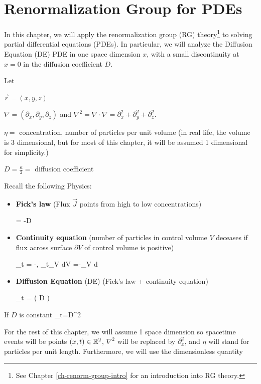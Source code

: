 \chapter{Renormalization Group for PDEs}
\label{ch-renorm-group-pde}

%
%

In this chapter, we will
apply the renormalization group (RG)
theory\footnote{See Chapter \ref{ch-renorm-group-intro}
for an introduction into RG theory.} to solving partial differential equations (PDEs).
In particular, we will analyze the Diffusion Equation (DE) PDE
in one space dimension $x$, with a small discontinuity at $x=0$ 
in the diffusion coefficient $D$.

Let

$\vec{r}=(x,y,z)$


$\nabla = (\partial_{x}, \partial_{y}, \partial_{z})$ and $\nabla^2 = \nabla\cdot\nabla=\partial^2_x + \partial^2_y + \partial^2_z$.

$\eta=$ concentration,
number of particles per unit volume (in real life, the volume 
is 3 dimensional, but for most of this chapter, it will be
assumed 1 dimensional for simplicity.)

$D=\frac{\kappa}{2}=$ diffusion coefficient

Recall the following Physics:
\begin{itemize}
\item {\bf Fick's law} (Flux $\vec{J}$ points from high to low concentrations)

\beq
{}= -D\nabla \eta
\eeq
\item {\bf Continuity equation} (number of particles in control volume $V$  deceases if flux across surface $\partial V$ of control volume is positive)

\beq
\partial_t \eta = -\nabla\cdot {}, \quad \partial_t\int_V dV\; \eta =-\int_{\partial V} d\cdot {}
\eeq

\item
{\bf Diffusion Equation }(DE) (Fick's law + continuity equation)

\beq
\partial_t \eta = \nabla 
\left(
D\nabla \eta
\right)
\eeq
\end{itemize}

If $D$ is constant
\beq
\partial_t\eta=D\nabla^2 \eta
\eeq

For the rest of this chapter, we will assume 1 space dimension so spacetime events will be points $(x,t)\in{ \mathbb{R}}^2$,
$\nabla^2$ will be replaced by $\partial_x^2$, and $\eta$
will stand for particles per unit length. 
Furthermore, we will use the dimensionless quantity

